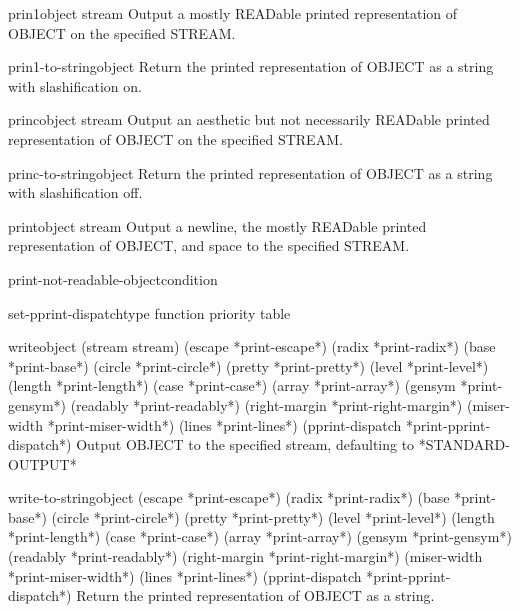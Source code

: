 \begin{function}{prin1}{object \op stream}
  Output a mostly READable printed representation of OBJECT on the specified
  STREAM.
\end{function}

\begin{function}{prin1-to-string}{object}
  Return the printed representation of OBJECT as a string with
   slashification on.
\end{function}

\begin{function}{princ}{object \op stream}
  Output an aesthetic but not necessarily READable printed representation
  of OBJECT on the specified STREAM.
\end{function}

\begin{function}{princ-to-string}{object}
  Return the printed representation of OBJECT as a string with
  slashification off.
\end{function}

\begin{function}{print}{object \op stream}
  Output a newline, the mostly READable printed representation of OBJECT, and
  space to the specified STREAM.
\end{function}

\begin{function}{print-not-readable-object}{condition}
  
\end{function}

\begin{function}{set-pprint-dispatch}{type function \op priority table}
  
\end{function}

\begin{function}{write}{object \key (stream stream) (escape *print-escape*) (radix *print-radix*)
 (base *print-base*) (circle *print-circle*) (pretty *print-pretty*)
 (level *print-level*) (length *print-length*) (case *print-case*)
 (array *print-array*) (gensym *print-gensym*) (readably *print-readably*)
 (right-margin *print-right-margin*) (miser-width *print-miser-width*)
 (lines *print-lines*) (pprint-dispatch *print-pprint-dispatch*)}
  Output OBJECT to the specified stream, defaulting to *STANDARD-OUTPUT*
\end{function}

\begin{function}{write-to-string}{object \key (escape *print-escape*) (radix *print-radix*) (base *print-base*)
 (circle *print-circle*) (pretty *print-pretty*) (level *print-level*)
 (length *print-length*) (case *print-case*) (array *print-array*)
 (gensym *print-gensym*) (readably *print-readably*)
 (right-margin *print-right-margin*) (miser-width *print-miser-width*)
 (lines *print-lines*) (pprint-dispatch *print-pprint-dispatch*)}
  Return the printed representation of OBJECT as a string.
\end{function}


